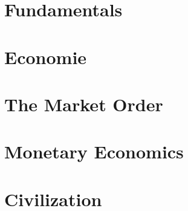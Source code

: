 \documentclass[smalldemyvopaper,10pt,twoside,onecolumn,openright,extrafontsizes]{memoir}
\makeatletter
\renewcommand\listoftables{%
        \@starttoc{lot}%
}
\renewcommand\listoffigures{%
        \@starttoc{lof}%
}
\makeatother
\begin{document}


\mainmatter

\part{Fundamentals}



\part{Economie}



\part{The Market Order}
\part{Monetary Economics}
\part{Civilization}

\backmatter



\nocite{*} %
\printbibliography

\printindex
{}
\end{document}
